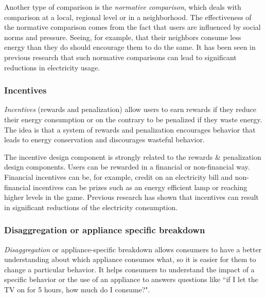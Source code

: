 \documentclass[journal]{vgtc}                %
\begin{document}
Another type of comparison is the \textit{normative comparison}, which deals with comparison at a local, regional level or in a neighborhood. The effectiveness of the normative comparison comes from the fact that users are influenced by social norms and pressure. Seeing, for example, that their neighbors consume less energy than they do should encourage them to do the same. It has been seen in previous research that such normative comparisons can lead to significant reductions in electricity usage\cite{peschiera2010response,siero1996changing,iyer2006comparison}.


\subsubsection{Incentives}
\textit{Incentives} (rewards and penalization) allow users to earn rewards if they reduce their energy consumption or on the contrary to be penalized if they waste energy. The idea is that a system of rewards and penalization encourages behavior that leads to energy conservation and discourages wasteful behavior.

The incentive design component is strongly related to the rewards \& penalization design components. Users can be rewarded in a financial or non-financial way. Financial incentives can be, for example, credit on an electricity bill and non-financial incentives can be prizes such as an energy efficient lamp or reaching higher levels in the game.
Previous research \cite{petersen2007dormitory} has shown that incentives can result in significant reductions of the electricity consumption.

\subsubsection{Disaggregation or appliance specific breakdown}
\textit{Disaggregation} or appliance-specific breakdown allows consumers to have a better understanding about which appliance consumes what, so it is easier for them to change a particular behavior. It helps consumers to understand the impact of a specific behavior or the use of an appliance to answers questions like ``if I let the TV on for 5 hours, how much do I consume?".
\end{document}
